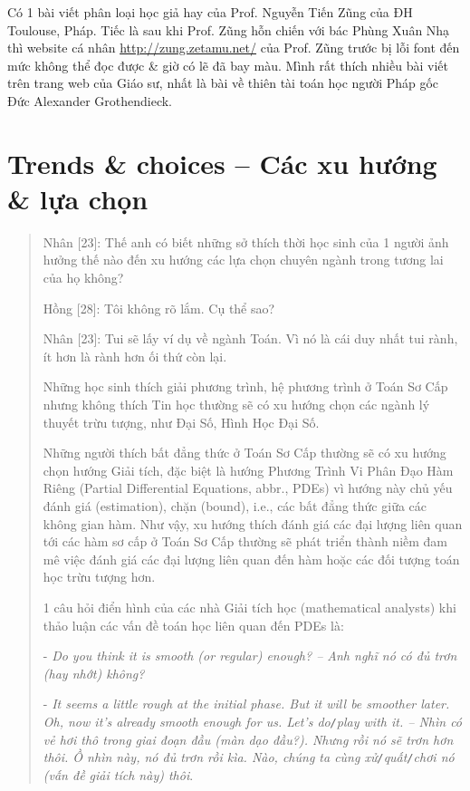 \documentclass[12pt,twoside]{book}
\begin{document}
Có 1 bài viết phân loại học giả hay của Prof. {\sc Nguyễn Tiến Zũng} của ĐH Toulouse, Pháp. Tiếc là sau khi Prof. Zũng hỗn chiến với bác  Phùng Xuân Nhạ thì website cá nhân \url{http://zung.zetamu.net/} của Prof. {\sc Zũng} trước bị lỗi font đến mức không thể đọc được \& giờ có lẽ đã bay màu. Mình rất thích nhiều bài viết trên trang web của Giáo sư, nhất là bài về thiên tài toán học người Pháp gốc Đức {\sc Alexander Grothendieck}.

\section{Trends \& choices -- Các xu hướng \& lựa chọn}	

\begin{quote}
	{\sf Nhân [23]}: Thế anh có biết những sở thích thời học sinh của 1 người ảnh hưởng thế nào đến xu hướng các lựa chọn chuyên ngành trong tương lai của họ không?
	
	{\sf Hồng [28]}: Tôi không rõ lắm. Cụ thể sao?
	
	{\sf Nhân [23]}: Tui sẽ lấy ví dụ về ngành Toán. Vì nó là cái duy nhất tui rành, ít hơn là rành hơn ối thứ còn lại.
	
	Những học sinh thích giải phương trình, hệ phương trình ở Toán Sơ Cấp nhưng không thích Tin học thường sẽ có xu hướng chọn các ngành lý thuyết trừu tượng, như Đại Số, Hình Học Đại Số. 
	
	Những người thích bất đẳng thức ở Toán Sơ Cấp thường sẽ có xu hướng chọn hướng Giải tích, đặc biệt là hướng Phương Trình Vi Phân Đạo Hàm Riêng (Partial Differential Equations, abbr., PDEs) vì hướng này chủ yếu đánh giá (estimation), chặn (bound), i.e., các bất đẳng thức giữa các không gian hàm. Như vậy, xu hướng thích đánh giá các đại lượng liên quan tới các hàm sơ cấp ở Toán Sơ Cấp thường sẽ phát triển thành niềm đam mê việc đánh giá các đại lượng liên quan đến hàm hoặc các đối tượng toán học trừu tượng hơn.

	1 câu hỏi điển hình của các nhà Giải tích học (mathematical analysts) khi thảo luận các vấn đề toán học liên quan đến PDEs là:
	
	- {\it Do you think it is smooth (or regular) enough? -- Anh nghĩ nó có đủ trơn (hay nhớt) không?}
	
	- {\it It seems a little rough at the initial phase. But it will be smoother later. Oh, now it's already smooth enough for us. Let's do{\tt/}play with it. -- Nhìn có vẻ hơi thô trong giai đoạn đầu (màn dạo đầu?). Nhưng rồi nó sẽ trơn hơn thôi. Ồ nhìn này, nó đủ trơn rồi kìa. Nào, chúng ta cùng xử{\tt/}quất{\tt/}chơi nó (vấn đề giải tích này) thôi}.
	

\end{quote}
\end{document}
